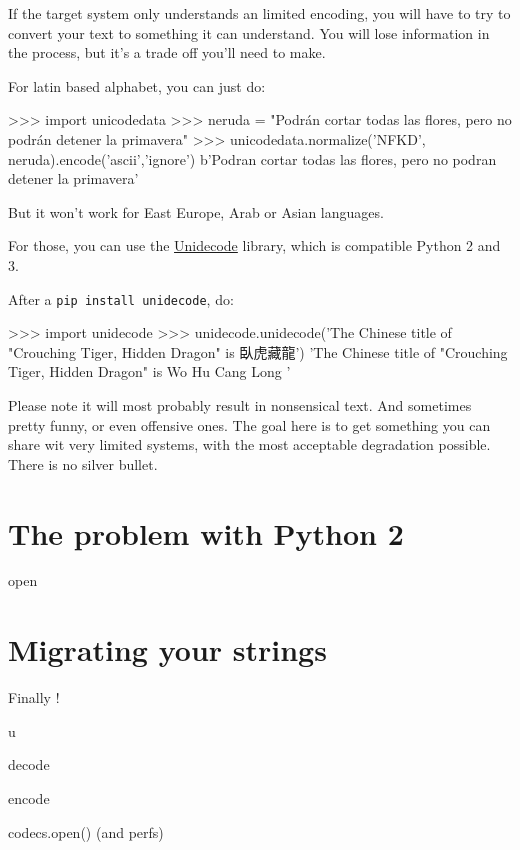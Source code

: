 If the target system only understands an limited encoding, you will have to try to convert your text to something it can understand. You will lose information in the process, but it's a trade off you'll need to make.

For latin based alphabet, you can just do:

\begin{py3}
>>> import unicodedata
>>> neruda = "Podrán cortar todas las flores, pero no podrán detener la primavera"
>>> unicodedata.normalize('NFKD', neruda).encode('ascii','ignore')
b'Podran cortar todas las flores, pero no podran detener la primavera'
\end{py3}

But it won't work for East Europe, Arab or Asian languages.

For those, you can use the \href{https://pypi.org/project/Unidecode/}{Unidecode} library, which is compatible Python 2 and 3.

After a \lstinline{pip install unidecode}, do:

\begin{py3}
>>> import unidecode
>>> unidecode.unidecode('The Chinese title of "Crouching Tiger, Hidden Dragon" is 臥虎藏龍')
'The Chinese title of "Crouching Tiger, Hidden Dragon" is Wo Hu Cang Long '
\end{py3}

Please note it will most probably result in nonsensical text. And sometimes pretty funny, or even offensive ones. The goal here is to get something you can share wit very limited systems, with the most acceptable degradation possible. There is no silver bullet.

\section{The problem with Python 2}



open

\section{Migrating your strings}

Finally !



u

decode

encode

codecs.open() (and perfs)

